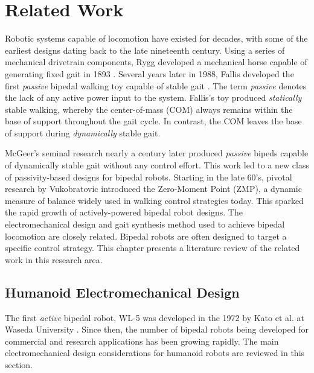 \chapter{Related Work} %
\label{cha:background}
Robotic systems capable of locomotion have existed for decades, with some of the earliest designs dating back to the late nineteenth century. Using a series of mechanical drivetrain components, Rygg developed a mechanical horse capable of generating fixed gait in 1893 \cite{rygg1893mechanical}. Several years later in 1988, Fallis developed the first \emph{passive} bipedal walking toy capable of stable gait \cite{pallis1888fallis}. The term \emph{passive} denotes the lack of any active power input to the system. Fallis's toy produced \emph{statically} stable walking, whereby the center-of-mass (COM) always remains within the base of support throughout the gait cycle. In contrast, the COM leaves the base of support during \emph{dynamically} stable gait. 

McGeer's seminal research \cite{McGeer:1990uk} nearly a century later produced \emph{passive} bipeds capable of dynamically stable gait without any control effort. This work led to a new class of passivity-based designs for bipedal robots. Starting in the late 60's, pivotal research by Vukobratovic \cite{vukobratovic1969} introduced the Zero-Moment Point (ZMP), a dynamic measure of balance widely used in walking control strategies today. This sparked the rapid growth of actively-powered bipedal robot designs. The electromechanical design and gait synthesis method used to achieve bipedal locomotion are closely related. Bipedal robots are often designed to target a specific control strategy. This chapter presents a literature review of the related work in this research area. 





\section{Humanoid Electromechanical Design} %
\label{sec:related_electromechanical_design}
The first \emph{active} bipedal robot, WL-5 was developed in the 1972 by Kato et al. at Waseda University \cite{kato1972hydraulically}. Since then, the number of bipedal robots being developed for commercial and research applications has been growing rapidly. The main electromechanical design considerations for humanoid robots are reviewed in this section. 


